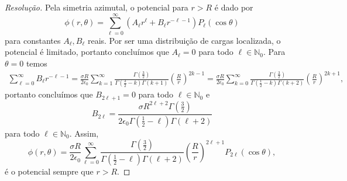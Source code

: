\begin{proof}[Resolução]
    Pela simetria azimutal, o potencial para \(r > R\) é dado por
    \begin{equation*}
        \phi(r, \theta) = \sum_{\ell = 0}^\infty \left(A_\ell r^\ell + B_\ell r^{-\ell -1}\right)P_\ell(\cos\theta)
    \end{equation*}
    para constantes \(A_\ell, B_\ell\) reais. Por ser uma distribuição de cargas localizada, o potencial é limitado, portanto concluímos que \(A_\ell = 0\) para todo \(\ell \in \mathbb{N}_0\). Para \(\theta = 0\) temos
    \begin{align*}
        \sum_{\ell = 0}^\infty B_\ell r^{-\ell - 1}
        = \frac{\sigma R}{2 \epsilon_0} \sum_{k = 1}^\infty \frac{\Gamma\left(\frac32\right)}{\Gamma\left(\frac32 - k\right) \Gamma(k + 1)}\left(\frac{R}{r}\right)^{2k-1}
        = \frac{\sigma R}{2 \epsilon_0} \sum_{k = 0}^\infty \frac{\Gamma\left(\frac32\right)}{\Gamma\left(\frac12 - k\right) \Gamma(k + 2)}\left(\frac{R}{r}\right)^{2k+1},
    \end{align*}
    portanto concluímos que \(B_{2\ell + 1} = 0\) para todo \(\ell \in \mathbb{N}_0\) e
    \begin{equation*}
        B_{2\ell} = \frac{\sigma R^{2\ell + 2}\Gamma\left(\frac32\right)}{2 \epsilon_0 \Gamma(\frac12 - \ell) \Gamma(\ell+2)}
    \end{equation*}
    para todo \(\ell \in \mathbb{N}_0\). Assim,
    \begin{equation*}
        \phi(r, \theta) = \frac{\sigma R}{2 \epsilon_0}\sum_{\ell = 0}^\infty \frac{\Gamma\left(\frac32\right)}{\Gamma\left(\frac12 - \ell\right)\Gamma(\ell + 2)} \left(\frac{R}{r}\right)^{2\ell + 1} P_{2\ell}(\cos\theta),
    \end{equation*}
    é o potencial sempre que \(r > R\).
\end{proof}
